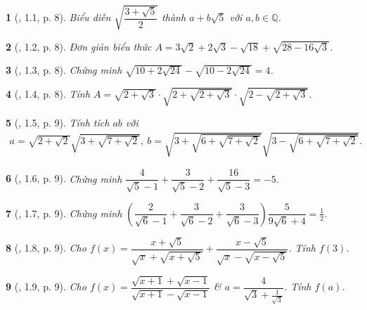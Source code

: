 \documentclass{article}
\newtheorem{baitoan}{}
\begin{document}
\begin{baitoan}[\cite{TLCT_THCS_Toan_9_dai_so}, 1.1, p. 8]
	Biểu diễn $\sqrt{\dfrac{3 + \sqrt{5}}{2}}$ thành $a + b\sqrt{5}$ với $a,b\in\mathbb{Q}$.
\end{baitoan}

\begin{baitoan}[\cite{TLCT_THCS_Toan_9_dai_so}, 1.2, p. 8]
	Đơn giản biểu thức $A = 3\sqrt{2} + 2\sqrt{3} - \sqrt{18} + \sqrt{28 - 16\sqrt{3}}$.
\end{baitoan}

\begin{baitoan}[\cite{TLCT_THCS_Toan_9_dai_so}, 1.3, p. 8]
	Chứng minh $\sqrt{10 + 2\sqrt{24}} - \sqrt{10 - 2\sqrt{24}} = 4$.
\end{baitoan}

\begin{baitoan}[\cite{TLCT_THCS_Toan_9_dai_so}, 1.4, p. 8]
	Tính $A = \sqrt{2 + \sqrt{3}}\cdot\sqrt{2 + \sqrt{2 + \sqrt{3}}}\cdot\sqrt{2 - \sqrt{2 + \sqrt{3}}}$.
\end{baitoan}

\begin{baitoan}[\cite{TLCT_THCS_Toan_9_dai_so}, 1.5, p. 9]
	Tính tích $ab$ với
	\begin{align*}
		a = \sqrt{2 + \sqrt{2}}\sqrt{3 + \sqrt{7 + \sqrt{2}}},\ b = \sqrt{3 + \sqrt{6 + \sqrt{7 + \sqrt{2}}}}\sqrt{3 - \sqrt{6 + \sqrt{7 + \sqrt{2}}}}.
	\end{align*}
\end{baitoan}

\begin{baitoan}[\cite{TLCT_THCS_Toan_9_dai_so}, 1.6, p. 9]
	Chứng minh $\dfrac{4}{\sqrt{5} - 1} + \dfrac{3}{\sqrt{5} - 2} + \dfrac{16}{\sqrt{5} - 3} = -5$.
\end{baitoan}

\begin{baitoan}[\cite{TLCT_THCS_Toan_9_dai_so}, 1.7, p. 9]
	Chứng minh $\left(\dfrac{2}{\sqrt{6} - 1} + \dfrac{3}{\sqrt{6} - 2} + \dfrac{3}{\sqrt{6} - 3}\right)\dfrac{5}{9\sqrt{6} + 4} = \frac{1}{2}$.
\end{baitoan}

\begin{baitoan}[\cite{TLCT_THCS_Toan_9_dai_so}, 1.8, p. 9]
	Cho $f(x) = \dfrac{x + \sqrt{5}}{\sqrt{x} + \sqrt{x + \sqrt{5}}} + \dfrac{x - \sqrt{5}}{\sqrt{x} - \sqrt{x - \sqrt{5}}}$. Tính $f(3)$.
\end{baitoan}

\begin{baitoan}[\cite{TLCT_THCS_Toan_9_dai_so}, 1.9, p. 9]
	Cho $f(x) = \dfrac{\sqrt{x + 1} + \sqrt{x - 1}}{\sqrt{x + 1} - \sqrt{x - 1}}$ \& $a = \dfrac{4}{\sqrt{3} + \frac{1}{\sqrt{3}}}$. Tính $f(a)$.
\end{baitoan}
\end{document}
